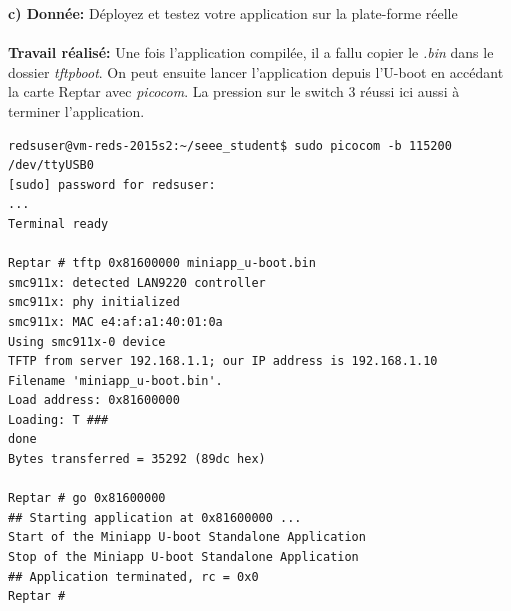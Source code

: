 \textbf{c) Donnée: }Déployez et testez votre application sur la plate-forme réelle\\\\
\textbf{Travail réalisé: }Une fois l'application compilée, il a fallu copier le \textit{.bin} dans le dossier \textit{tftpboot}. On peut ensuite lancer l'application depuis l'U-boot en accédant la carte Reptar avec \textit{picocom}. La pression sur le switch 3 réussi ici aussi à terminer l'application.
\begin{lstlisting}
redsuser@vm-reds-2015s2:~/seee_student$ sudo picocom -b 115200 /dev/ttyUSB0
[sudo] password for redsuser: 
...
Terminal ready

Reptar # tftp 0x81600000 miniapp_u-boot.bin
smc911x: detected LAN9220 controller
smc911x: phy initialized
smc911x: MAC e4:af:a1:40:01:0a
Using smc911x-0 device
TFTP from server 192.168.1.1; our IP address is 192.168.1.10
Filename 'miniapp_u-boot.bin'.
Load address: 0x81600000
Loading: T ###
done
Bytes transferred = 35292 (89dc hex)

Reptar # go 0x81600000
## Starting application at 0x81600000 ...
Start of the Miniapp U-boot Standalone Application
Stop of the Miniapp U-boot Standalone Application
## Application terminated, rc = 0x0
Reptar # 
\end{lstlisting}


